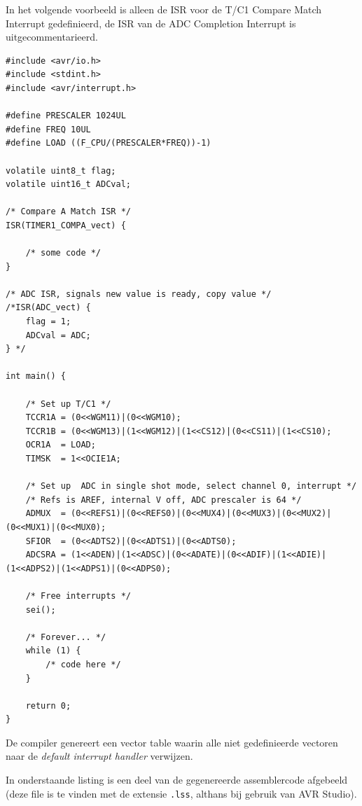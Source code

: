 \documentclass[12pt,a4paper,final,twoside,fleqn]{article}
\def\lstC{\lstinline[style=C]}
\begin{document}
In het volgende voorbeeld is alleen de ISR voor de T/C1 Compare Match Interrupt gedefinieerd,
de ISR van de ADC Completion Interrupt is uitgecommentarieerd.

\begin{lstlisting}[style=C,caption=ISR vergeten]
#include <avr/io.h>
#include <stdint.h>
#include <avr/interrupt.h>

#define PRESCALER 1024UL
#define FREQ 10UL
#define LOAD ((F_CPU/(PRESCALER*FREQ))-1)

volatile uint8_t flag;
volatile uint16_t ADCval;

/* Compare A Match ISR */
ISR(TIMER1_COMPA_vect) {

	/* some code */
}

/* ADC ISR, signals new value is ready, copy value */
/*ISR(ADC_vect) {
	flag = 1;
	ADCval = ADC;
} */

int main() {

	/* Set up T/C1 */
	TCCR1A = (0<<WGM11)|(0<<WGM10);
	TCCR1B = (0<<WGM13)|(1<<WGM12)|(1<<CS12)|(0<<CS11)|(1<<CS10);
	OCR1A  = LOAD;
	TIMSK  = 1<<OCIE1A;

	/* Set up  ADC in single shot mode, select channel 0, interrupt */
	/* Refs is AREF, internal V off, ADC prescaler is 64 */
	ADMUX  = (0<<REFS1)|(0<<REFS0)|(0<<MUX4)|(0<<MUX3)|(0<<MUX2)|(0<<MUX1)|(0<<MUX0);
	SFIOR  = (0<<ADTS2)|(0<<ADTS1)|(0<<ADTS0);
	ADCSRA = (1<<ADEN)|(1<<ADSC)|(0<<ADATE)|(0<<ADIF)|(1<<ADIE)|(1<<ADPS2)|(1<<ADPS1)|(0<<ADPS0);

	/* Free interrupts */
	sei();

	/* Forever... */
	while (1) {
		/* code here */
	}

	return 0;
}
\end{lstlisting}

De compiler genereert een vector table waarin alle niet gedefinieerde vectoren
naar de \textsl{default interrupt handler} verwijzen.

In onderstaande listing is een deel van de gegenereerde assemblercode afgebeeld
(deze file is te vinden met de extensie \lstC{.lss}, althans bij gebruik van
AVR Studio).
\end{document}
